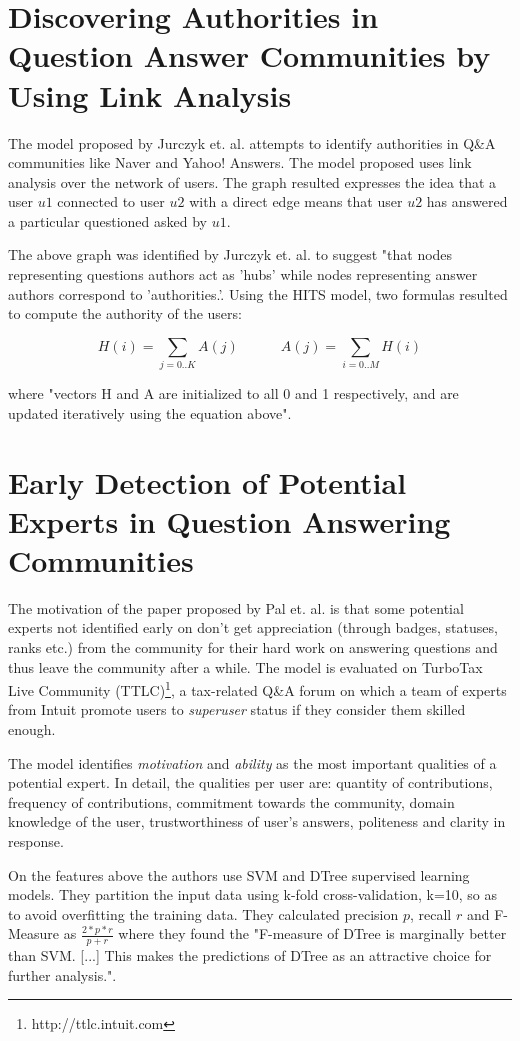 \section{Discovering Authorities in Question Answer Communities by Using Link Analysis}

The model proposed by Jurczyk et. al.\cite{qalink} attempts to identify authorities in Q\&A communities like Naver and Yahoo! Answers. The model proposed uses link analysis over the network of users. The graph resulted expresses the idea that a user $u1$ connected to user $u2$ with a direct edge means that user $u2$ has answered a particular questioned asked by $u1$.

The above graph was identified by Jurczyk et. al. to suggest "that nodes representing questions authors act as 'hubs' while nodes representing answer authors correspond to 'authorities.'. Using the HITS\cite{hits} model, two formulas resulted to compute the authority of the users:

$$H(i) = \sum_{j=0..K}A(j)\quad\quad\quad A(j) = \sum_{i=0..M}H(i)$$

where "vectors H and A are initialized to all 0 and 1 respectively, and are updated iteratively using the equation above".


\section{Early Detection of Potential Experts in Question Answering Communities}

The motivation of the paper proposed by Pal et. al.\cite{qapal} is that some potential experts not identified early on don't get appreciation (through badges, statuses, ranks etc.) from the community for their hard work on answering questions and thus leave the community after a while.
The model is evaluated on TurboTax Live Community (TTLC)\footnote{\label{ttlc}http://ttlc.intuit.com}, a tax-related Q\&A forum on which a team of experts from Intuit promote users to \textit{superuser} status if they consider them skilled enough.

The model identifies \textit{motivation} and \textit{ability} as the most important qualities of a potential expert. In detail, the qualities per user are: quantity of contributions, frequency of contributions, commitment towards the community, domain knowledge of the user, trustworthiness of user's answers, politeness and clarity in response.

On the features above the authors use SVM and DTree supervised learning models. They partition the input data using k-fold cross-validation, k=10, so as to avoid overfitting the training data. They calculated precision $p$, recall $r$ and F-Measure as $\frac{2*p*r}{p+r}$ where they found the "F-measure of DTree is marginally better than SVM. [...] This makes the predictions of DTree as an attractive choice for further analysis.".

